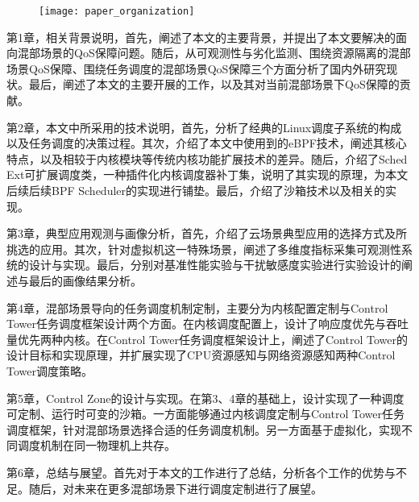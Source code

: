 \begin{figure}[!htbp]
    \centering
    \texttt{[image: paper\_organization]}
    \label{fig:paper_organization}
\end{figure}

第1章，相关背景说明，首先，阐述了本文的主要背景，并提出了本文要解决的面向混部场景的QoS保障问题。随后，从可观测性与劣化监测、围绕资源隔离的混部场景QoS保障、围绕任务调度的混部场景QoS保障三个方面分析了国内外研究现状。最后，阐述了本文的主要开展的工作，以及其对当前混部场景下QoS保障的贡献。

第2章，本文中所采用的技术说明，首先，分析了经典的Linux调度子系统的构成以及任务调度的决策过程。其次，介绍了本文中使用到的eBPF技术，阐述其核心特点，以及相较于内核模块等传统内核功能扩展技术的差异。随后，介绍了Sched Ext可扩展调度类，一种插件化内核调度器补丁集，说明了其实现的原理，为本文后续后续BPF Scheduler的实现进行铺垫。最后，介绍了沙箱技术以及相关的实现。

第3章，典型应用观测与画像分析，首先，介绍了云场景典型应用的选择方式及所挑选的应用。其次，针对虚拟机这一特殊场景，阐述了多维度指标采集可观测性系统的设计与实现。最后，分别对基准性能实验与干扰敏感度实验进行实验设计的阐述与最后的画像结果分析。

第4章，混部场景导向的任务调度机制定制，主要分为内核配置定制与Control Tower任务调度框架设计两个方面。在内核调度配置上，设计了响应度优先与吞吐量优先两种内核。在Control Tower任务调度框架设计上，阐述了Control Tower的设计目标和实现原理，并扩展实现了CPU资源感知与网络资源感知两种Control Tower调度策略。

第5章，Control Zone的设计与实现。在第3、4章的基础上，设计实现了一种调度可定制、运行时可变的沙箱。一方面能够通过内核调度定制与Control Tower任务调度框架，针对混部场景选择合适的任务调度机制。另一方面基于虚拟化，实现不同调度机制在同一物理机上共存。

第6章，总结与展望。首先对于本文的工作进行了总结，分析各个工作的优势与不足。随后，对未来在更多混部场景下进行调度定制进行了展望。